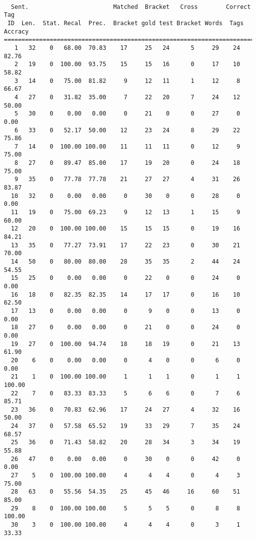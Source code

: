 \begin{verbatim}

  Sent.                        Matched  Bracket   Cross        Correct Tag
 ID  Len.  Stat. Recal  Prec.  Bracket gold test Bracket Words  Tags Accracy
============================================================================
   1   32    0   68.00  70.83    17     25   24      5     29    24    82.76
   2   19    0  100.00  93.75    15     15   16      0     17    10    58.82
   3   14    0   75.00  81.82     9     12   11      1     12     8    66.67
   4   27    0   31.82  35.00     7     22   20      7     24    12    50.00
   5   30    0    0.00   0.00     0     21    0      0     27     0     0.00
   6   33    0   52.17  50.00    12     23   24      8     29    22    75.86
   7   14    0  100.00 100.00    11     11   11      0     12     9    75.00
   8   27    0   89.47  85.00    17     19   20      0     24    18    75.00
   9   35    0   77.78  77.78    21     27   27      4     31    26    83.87
  10   32    0    0.00   0.00     0     30    0      0     28     0     0.00
  11   19    0   75.00  69.23     9     12   13      1     15     9    60.00
  12   20    0  100.00 100.00    15     15   15      0     19    16    84.21
  13   35    0   77.27  73.91    17     22   23      0     30    21    70.00
  14   50    0   80.00  80.00    28     35   35      2     44    24    54.55
  15   25    0    0.00   0.00     0     22    0      0     24     0     0.00
  16   18    0   82.35  82.35    14     17   17      0     16    10    62.50
  17   13    0    0.00   0.00     0      9    0      0     13     0     0.00
  18   27    0    0.00   0.00     0     21    0      0     24     0     0.00
  19   27    0  100.00  94.74    18     18   19      0     21    13    61.90
  20    6    0    0.00   0.00     0      4    0      0      6     0     0.00
  21    1    0  100.00 100.00     1      1    1      0      1     1   100.00
  22    7    0   83.33  83.33     5      6    6      0      7     6    85.71
  23   36    0   70.83  62.96    17     24   27      4     32    16    50.00
  24   37    0   57.58  65.52    19     33   29      7     35    24    68.57
  25   36    0   71.43  58.82    20     28   34      3     34    19    55.88
  26   47    0    0.00   0.00     0     30    0      0     42     0     0.00
  27    5    0  100.00 100.00     4      4    4      0      4     3    75.00
  28   63    0   55.56  54.35    25     45   46     16     60    51    85.00
  29    8    0  100.00 100.00     5      5    5      0      8     8   100.00
  30    3    0  100.00 100.00     4      4    4      0      3     1    33.33

\end{verbatim}
